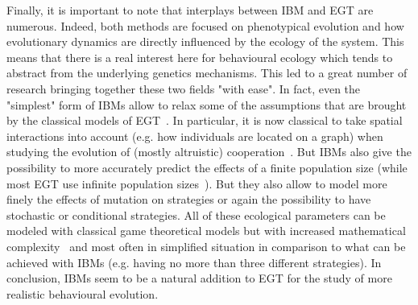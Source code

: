     Finally, it is important to note that interplays between IBM and EGT are numerous. Indeed, both methods are focused on phenotypical evolution and how evolutionary dynamics are directly influenced by the ecology of the system. This means that there is a real interest here for behavioural ecology which tends to abstract from the underlying genetics mechanisms. This led to a great number of research bringing together these two fields "with ease". In fact, even the "simplest" form of IBMs allow to relax some of the assumptions that are brought by the classical models of EGT~\parencite{Adami2014}. In particular, it is now classical to take spatial interactions into account (e.g. how individuals are located on a graph) when studying the evolution of (mostly altruistic) cooperation~\parencite{Hauert2004}. But IBMs also give the possibility to more accurately predict the effects of a finite population size (while most EGT use infinite population sizes~\parencite{Hauert2009}). But they also allow to model more finely the effects of mutation on strategies or again the possibility to have stochastic or conditional strategies. All of these ecological parameters can be modeled with classical game theoretical models but with increased mathematical complexity~\parencite{Hauert2009} and most often in simplified situation in comparison to what can be achieved with IBMs (e.g. having no more than three different strategies). In conclusion, IBMs seem to be a natural addition to EGT for the study of more realistic behavioural evolution.



